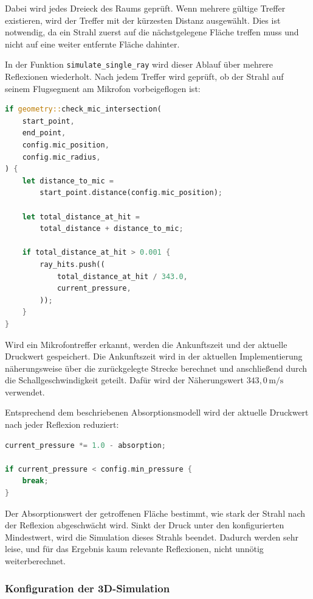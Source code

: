 Dabei wird jedes Dreieck des Raums geprüft. Wenn mehrere gültige Treffer
existieren, wird der Treffer mit der kürzesten Distanz ausgewählt. Dies ist
notwendig, da ein Strahl zuerst auf die nächstgelegene Fläche treffen muss und
nicht auf eine weiter entfernte Fläche dahinter.

In der Funktion \texttt{simulate\_single\_ray} wird dieser Ablauf über mehrere
Reflexionen wiederholt. Nach jedem Treffer wird geprüft, ob der Strahl auf
seinem Flugsegment am Mikrofon vorbeigeflogen ist:

\begin{lstlisting}[language=Rust]
if geometry::check_mic_intersection(
    start_point,
    end_point,
    config.mic_position,
    config.mic_radius,
) {
    let distance_to_mic =
        start_point.distance(config.mic_position);

    let total_distance_at_hit =
        total_distance + distance_to_mic;

    if total_distance_at_hit > 0.001 {
        ray_hits.push((
            total_distance_at_hit / 343.0,
            current_pressure,
        ));
    }
}
\end{lstlisting}

Wird ein Mikrofontreffer erkannt, werden die Ankunftszeit und der aktuelle
Druckwert gespeichert. Die Ankunftszeit wird in der aktuellen Implementierung
näherungsweise über die zurückgelegte Strecke berechnet und anschließend durch
die Schallgeschwindigkeit geteilt. Dafür wird der Näherungswert
\(343{,}0\,\mathrm{m/s}\) verwendet.

Entsprechend dem beschriebenen Absorptionsmodell wird der aktuelle Druckwert
nach jeder Reflexion reduziert:

\begin{lstlisting}[language=Rust]
current_pressure *= 1.0 - absorption;

if current_pressure < config.min_pressure {
    break;
}
\end{lstlisting}

Der Absorptionswert der getroffenen Fläche bestimmt, wie stark der Strahl nach der Reflexion abgeschwächt wird.
Sinkt der Druck unter den konfigurierten Mindestwert, wird die Simulation dieses Strahls beendet.
Dadurch werden sehr leise, und für das Ergebnis kaum relevante Reflexionen, nicht unnötig weiterberechnet.

\subsubsection{Konfiguration der 3D-Simulation}
\label{subsubsec:3d_config}

